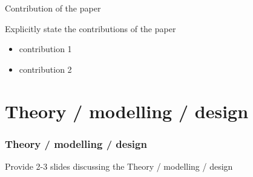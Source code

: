 \documentclass[handout]{beamer}\mode<handout>{\usetheme{AMSBolognaFC}}
\begin{document}
\begin{frame}{Contribution of the paper}

\begin{block}{Explicitly state the contributions of the paper}
    \begin{itemize}
        \item contribution 1
        \item contribution 2
    \end{itemize}
\end{block}

\end{frame}

\section{Theory / modelling / design}

\begin{frame}%
\frametitle{Theory / modelling / design}

    Provide 2-3 slides discussing the Theory / modelling / design

\end{frame}
\end{document}
